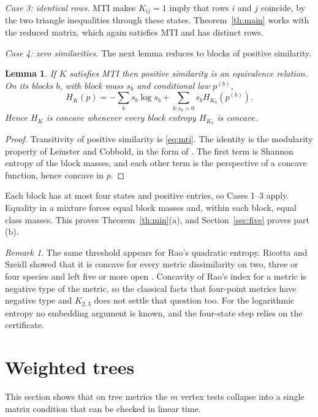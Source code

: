 \documentclass[11pt,a4paper]{article}
\newtheorem{lemma}[theorem]{Lemma}
\theoremstyle{remark}
\newtheorem{remark}[theorem]{Remark}
\begin{document}
\emph{Case 3: identical rows.} MTI makes $K_{ij}=1$ imply that rows $i$ and $j$ coincide, by the two triangle inequalities through these states. Theorem~\ref{th:main} works with the reduced matrix, which again satisfies MTI and has distinct rows.

\emph{Case 4: zero similarities.} The next lemma reduces to blocks of positive similarity.

\begin{lemma}\label{lem:blocks}
If $K$ satisfies MTI then positive similarity is an equivalence relation. On its blocks $b$, with block mass $s_b$ and conditional law $p^{(b)}$,
\[
 H_K(p)=-\sum_b s_b\log s_b+\sum_{b:s_b>0}s_b H_{K_b}(p^{(b)}).
\]
Hence $H_K$ is concave whenever every block entropy $H_{K_b}$ is concave.
\end{lemma}
\begin{proof}
Transitivity of positive similarity is \eqref{eq:mti}. The identity is the modularity property of Leinster and Cobbold, in the form of \cite[Theorem 8]{bavaud}. The first term is Shannon entropy of the block masses, and each other term is the perspective of a concave function, hence concave in $p$.
\end{proof}
Each block has at most four states and positive entries, so Cases 1--3 apply. Equality in a mixture forces equal block masses and, within each block, equal class masses. This proves Theorem~\ref{th:min}(a), and Section~\ref{sec:five} proves part (b).

\begin{remark}
The same threshold appears for Rao's quadratic entropy. Ricotta and Szeidl showed that it is concave for every metric dissimilarity on two, three or four species and left five or more open \cite[Theorem 1 and Remark 1]{rs}. Concavity of Rao's index for a metric is negative type of the metric, so the classical facts that four-point metrics have negative type and $K_{2,3}$ does not \cite[Theorem 3.6 and Section 3.2]{meckes} settle that question too. For the logarithmic entropy no embedding argument is known, and the four-state step relies on the certificate.
\end{remark}

\section{Weighted trees}\label{sec:trees}
This section shows that on tree metrics the $m$ vertex tests collapse into a single matrix condition that can be checked in linear time.
\end{document}
